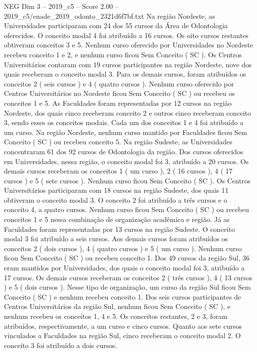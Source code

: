 \begin{textsample}{NEG Dim 3 – 2019\_c5 – Score 2.00 – 2019\_c5/enade\_2019\_odonto\_2321d6f7bf.txt}
Na região Nordeste, as Universidades participaram com 24 dos 55 cursos da Área de Odontologia oferecidos.
O conceito modal 4 foi atribuído a 16 cursos.
Os oito cursos restantes obtiveram conceitos 3 e 5.
Nenhum curso oferecido por Universidades no Nordeste recebeu conceito 1 e 2, e nenhum curso ficou Sem Conceito ( SC ).
Os Centros Universitários contaram com 19 cursos participantes na região Nordeste, nove dos quais receberam o conceito modal 3.
Para os demais cursos, foram atribuídos os conceitos 2 ( seis cursos ) e 4 ( quatro cursos ).
Nenhum curso oferecido por Centros Universitários no Nordeste ficou Sem Conceito ( SC ) ou recebeu os conceitos 1 e 5.
As Faculdades foram representadas por 12 cursos na região Nordeste, dos quais cinco receberam conceito 2 e outros cinco receberam conceito 3, sendo esses os conceitos modais.
Cada um dos conceitos 1 e 4 foi atribuído a um curso.
Na região Nordeste, nenhum curso mantido por Faculdades ficou Sem Conceito ( SC ) ou recebeu conceito 5.
Na região Sudeste, as Universidades concentraram 61 dos 92 cursos de Odontologia da região.
Dos cursos oferecidos em Universidades, nessa região, o conceito modal foi 3, atribuído a 20 cursos.
Os demais cursos receberam os conceitos 1 ( um curso ), 2 ( 16 cursos ), 4 ( 17 cursos ) e 5 ( sete cursos ).
Nenhum curso ficou Sem Conceito ( SC ).
Os Centros Universitários participaram com 18 cursos na região Sudeste, dos quais 11 obtiveram o conceito modal 3.
O conceito 2 foi atribuído a três cursos e o conceito 4, a quatro cursos.
Nenhum curso ficou Sem Conceito ( SC ) ou recebeu conceitos 1 e 5 nessa combinação de organização acadêmica e região.
Já as Faculdades foram representadas por 13 cursos na região Sudeste.
O conceito modal 3 foi atribuído a seis cursos.
Aos demais cursos foram atribuídos os conceitos 2 ( dois cursos ), 4 ( quatro cursos ) e 5 ( um curso ).
Nenhum curso ficou Sem Conceito ( SC ) ou recebeu conceito 1.
Dos 49 cursos da região Sul, 36 eram mantidos por Universidades, dos quais o conceito modal foi 3, atribuído a 17 cursos.
Os demais cursos receberam os conceitos 2 ( três cursos ), 4 ( 13 cursos ) e 5 ( dois cursos ).
Nesse tipo de organização, um curso da região Sul ficou Sem Conceito ( SC ) e nenhum recebeu conceito 1.
Dos seis cursos participantes de Centros Universitários da região Sul, nenhum ficou Sem Conceito ( SC ), e nenhum recebeu os conceitos 1, 4 e 5.
Os conceitos restantes, 2 e 3, foram atribuídos, respectivamente, a um curso e cinco cursos.
Quanto aos sete cursos vinculados a Faculdades na região Sul, cinco receberam o conceito modal 2.
O conceito 3 foi atribuído a dois cursos.

\end{textsample}
